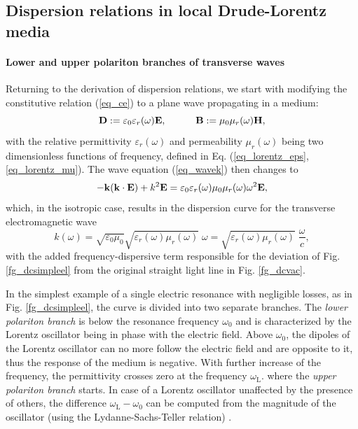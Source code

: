 \subsection{Dispersion relations in local Drude-Lorentz media} \label{disp_rel_local_media}
\paragraph{Lower and upper polariton branches of transverse waves}  %
Returning to the derivation of dispersion relations, we start with modifying the constitutive relation (\ref{eq_ce}) to a plane wave propagating in a medium:
\begin{equation}		\mathbf{D} := \varepsilon_0\varepsilon_r(\omega)	\mathbf{E}, \quad\quad\quad						\mathbf{B} := \mu_0\mu_r(\omega)		\mathbf{H},				 \label{eq_ce2}\end{equation}
with the relative permittivity $\varepsilon_r(\omega)$ and permeability $\mu_r(\omega)$ being two dimensionless functions of frequency, defined in Eq. (\ref{eq_lorentz_eps}, \ref{eq_lorentz_mu}). 
The wave equation (\ref{eq_wavek}) then changes to
\begin{equation} - {\mathbf{k}} ({\mathbf{k}} \cdot \mathbf{E}) + k^2 \mathbf{E} = \varepsilon_0 \varepsilon_r(\omega) \mu_0 \mu_r(\omega) \omega^{2} \mathbf{E}, \label{eq_wavek_disp} \end{equation}
which, in the isotropic case, results in the dispersion curve for the transverse electromagnetic wave 
\begin{equation} k(\omega) = \sqrt{\varepsilon_0 \mu_0} \sqrt{\varepsilon_{r}(\omega) \mu_{r}(\omega)}\;\omega = \sqrt{\varepsilon_{r}(\omega) \mu_{r}(\omega)}\; \frac{\omega}{c}, \label{eq_dispeq_loc}\end{equation}
with the added frequency-dispersive term responsible for the deviation of Fig. \ref{fg_dcsimpleel} from the original straight light line in Fig. \ref{fg_dcvac}. 





In the simplest example of a single electric resonance with negligible losses, as in Fig. \ref{fg_dcsimpleel}, the curve is divided into two separate branches. The \textit{lower polariton branch} is below the resonance frequency $\omega_0$ and is characterized by the Lorentz oscillator being in phase with the electric field. Above $\omega_0$, the dipoles of the Lorentz oscillator can no more follow the electric field and are opposite to it, thus the response of the medium is negative. With further increase of the frequency, the permittivity crosses zero at the frequency $\omega_{\text{L}}$. %
where the \textit{upper polariton branch} starts. In case of a Lorentz oscillator unaffected by the presence of others, the difference $\omega_{\text{L}} - \omega_0$ can be computed from the magnitude of the oscillator (using the Lydanne-Sachs-Teller relation) \cite{klingshirn2007semiconductor}.

